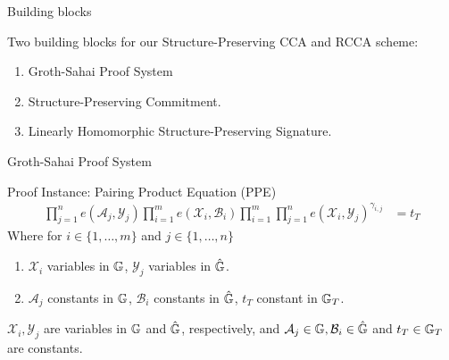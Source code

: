 
\begin{frame}{Building blocks}
  \begin{block}{Two building blocks for our Structure-Preserving CCA and RCCA scheme:}
    \begin{enumerate}
    \item Groth-Sahai Proof System 
    \item Structure-Preserving Commitment.
    \item Linearly Homomorphic Structure-Preserving Signature.
    \end{enumerate}
  \end{block}
\end{frame}


\begin{frame}{Groth-Sahai Proof System}
  \begin{block}{Proof Instance: Pairing Product Equation (PPE)}
    \begin{align*}
      \prod^{n}_{j=1} e(\mathcal{A}_j, \mathcal{Y}_j) \prod^{m}_{i=1}e(\mathcal{X}_i, \mathcal{B}_i)\prod^{m}_{i=1} \prod^{n}_{j=1}e(\mathcal{X}_i, \mathcal{Y}_j)^{\gamma_{i,j}} &= t_T
    \end{align*}
    Where for $i \in \{1, \dots, m\}$ and $j \in \{1, \dots, n\}$
    \begin{enumerate}
    \item $\mathcal{X}_i$ variables in $\mathbb{G}$, $\mathcal{Y}_j$ variables in $\hat{\mathbb{G}}$.
    \item $\mathcal{A}_j$ constants in $\mathbb{G}$, $\mathcal{B}_i$ constants in $\hat{\mathbb{G}}$, $t_T$ constant in $\mathbb{G}_T$.
    \end{enumerate}
    $\mathcal{X}_i, \mathcal{Y}_j$ are variables in $\mathbb{G}$ and $\hat{\mathbb{G}}$, respectively, and $\mathcal{A}_j \in \mathbb{G}, \mathcal{B}_i \in \hat{\mathbb{G}}$ and $t_T \in \mathbb{G}_T$ are constants.
  \end{block}
  
\end{frame}

